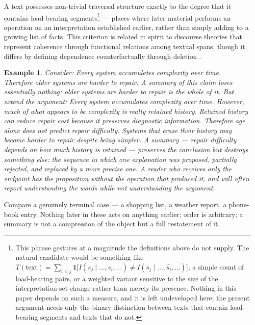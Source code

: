 \documentclass[11pt]{article}
\newtheorem{example}{Example}
\begin{document}
A text possesses non-trivial traversal structure exactly to the degree that it contains load-bearing segments\footnote{This phrase gestures at a magnitude the definitions above do not supply. The natural candidate would be something like $T(\text{text}) = \sum_{i<j} \mathbf{1}\bigl[I(s_j \mid \ldots, s_i, \ldots) \neq I(s_j \mid \ldots, \widehat{s_i}, \ldots)\bigr]$, a simple count of load-bearing pairs, or a weighted variant sensitive to the size of the interpretation-set change rather than merely its presence. Nothing in this paper depends on such a measure, and it is left undeveloped here; the present argument needs only the binary distinction between texts that contain load-bearing segments and texts that do not.} --- places where later material performs an operation on an interpretation established earlier, rather than simply adding to a growing list of facts. This criterion is related in spirit to discourse theories that represent coherence through functional relations among textual spans, though it differs by defining dependence counterfactually through deletion \citep{mannthompson1988}.

\begin{example}
Consider: \emph{Every system accumulates complexity over time. Therefore older systems are harder to repair.} A summary of this claim loses essentially nothing: \emph{older systems are harder to repair} is the whole of it. But extend the argument: \emph{Every system accumulates complexity over time. However, much of what appears to be complexity is really retained history. Retained history can reduce repair cost because it preserves diagnostic information. Therefore age alone does not predict repair difficulty. Systems that erase their history may become harder to repair despite being simpler.} A summary --- \emph{repair difficulty depends on how much history is retained} --- preserves the conclusion but destroys something else: the sequence in which one explanation was proposed, partially rejected, and replaced by a more precise one. A reader who receives only the endpoint has the proposition without the operation that produced it, and will often report understanding the words while not understanding the argument.
\end{example}

Compare a genuinely terminal case --- a shopping list, a weather report, a phone-book entry. Nothing later in these acts on anything earlier; order is arbitrary; a summary is not a compression of the object but a full restatement of it.
\end{document}
